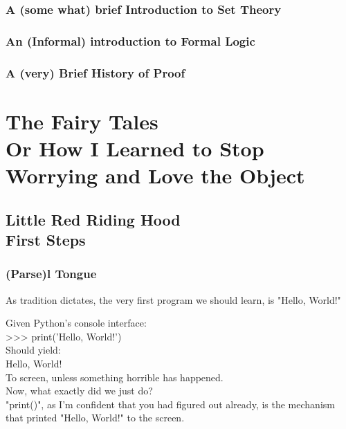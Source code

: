 \documentclass[oneside,12pt]{memoir} %
\begin{document}
\section{A (some what) brief Introduction to Set Theory}
\label{set_theory}
\section{An (Informal) introduction to Formal Logic}
\label{formal_logic}

\section{A (very) Brief History of Proof}
\label{proof}

\part{%
The Fairy Tales	\\
\large Or How I Learned to Stop \\
		Worrying and Love the Object}


\chapter{%
Little Red Riding Hood \\
\large First Steps}

\section{(Parse)l Tongue}
\label{parsel_tongue}

As tradition dictates, the very first program we should learn, is "Hello, World!"

Given Python's console interface:\\

{>}{>}{>} print('Hello, World!')\\

Should yield:\\
Hello, World!\\
To screen, unless something horrible has happened.\\


Now, what exactly did we just do? \\
"print()", as I'm confident that you had figured out already, is the mechanism that printed "Hello, World!" to the screen. 
\end{document}
